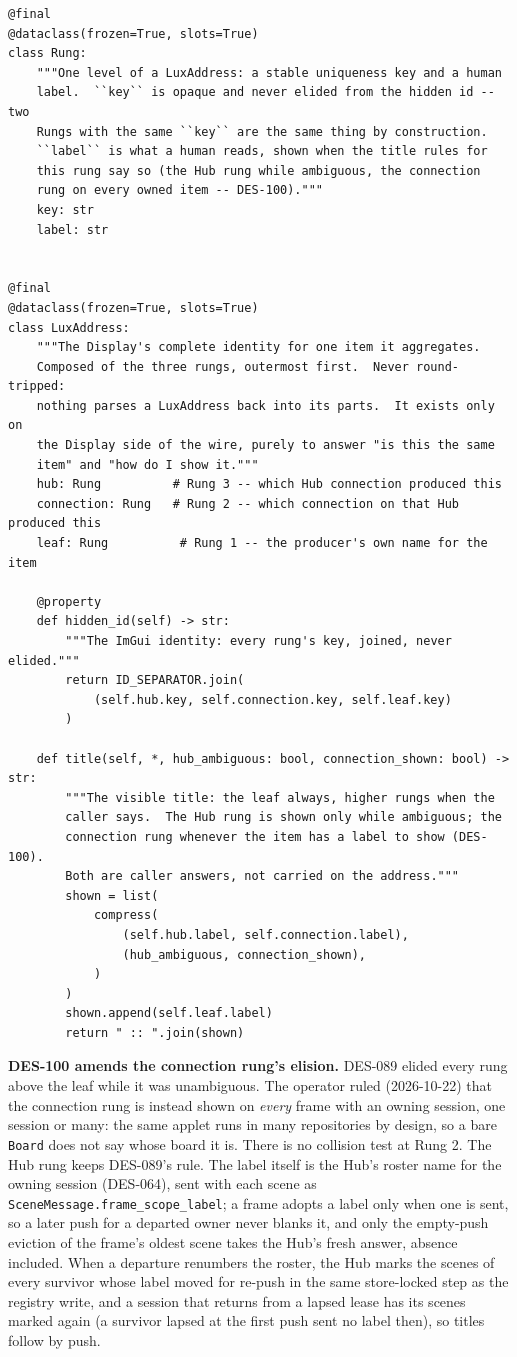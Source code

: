 \documentclass[a4paper,10pt]{article}
\newcommand{\field}[1]{\texttt{#1}}
\begin{document}
\begin{lstlisting}
@final
@dataclass(frozen=True, slots=True)
class Rung:
    """One level of a LuxAddress: a stable uniqueness key and a human
    label.  ``key`` is opaque and never elided from the hidden id -- two
    Rungs with the same ``key`` are the same thing by construction.
    ``label`` is what a human reads, shown when the title rules for
    this rung say so (the Hub rung while ambiguous, the connection
    rung on every owned item -- DES-100)."""
    key: str
    label: str


@final
@dataclass(frozen=True, slots=True)
class LuxAddress:
    """The Display's complete identity for one item it aggregates.
    Composed of the three rungs, outermost first.  Never round-tripped:
    nothing parses a LuxAddress back into its parts.  It exists only on
    the Display side of the wire, purely to answer "is this the same
    item" and "how do I show it."""
    hub: Rung          # Rung 3 -- which Hub connection produced this
    connection: Rung   # Rung 2 -- which connection on that Hub produced this
    leaf: Rung          # Rung 1 -- the producer's own name for the item

    @property
    def hidden_id(self) -> str:
        """The ImGui identity: every rung's key, joined, never elided."""
        return ID_SEPARATOR.join(
            (self.hub.key, self.connection.key, self.leaf.key)
        )

    def title(self, *, hub_ambiguous: bool, connection_shown: bool) -> str:
        """The visible title: the leaf always, higher rungs when the
        caller says.  The Hub rung is shown only while ambiguous; the
        connection rung whenever the item has a label to show (DES-100).
        Both are caller answers, not carried on the address."""
        shown = list(
            compress(
                (self.hub.label, self.connection.label),
                (hub_ambiguous, connection_shown),
            )
        )
        shown.append(self.leaf.label)
        return " :: ".join(shown)
\end{lstlisting}

\textbf{DES-100 amends the connection rung's elision.}  DES-089 elided
every rung above the leaf while it was unambiguous.  The operator ruled
(2026-10-22) that the connection rung is instead shown on \emph{every}
frame with an owning session, one session or many: the same applet runs in
many repositories by design, so a bare \texttt{Board} does not say whose
board it is.  There is no collision test at Rung 2.  The Hub rung keeps
DES-089's rule.  The label itself is the Hub's roster name for the owning
session (DES-064), sent with each scene as
\field{SceneMessage.frame\_scope\_label}; a frame adopts a label only when
one is sent, so a later push for a departed owner never blanks it, and
only the empty-push eviction of the frame's oldest scene takes the Hub's
fresh answer, absence included.  When a departure renumbers the roster,
the Hub marks the scenes of every survivor whose label moved for re-push
in the same store-locked step as the registry write, and a session that
returns from a lapsed lease has its scenes marked again (a survivor lapsed
at the first push sent no label then), so titles follow by push.
\end{document}
